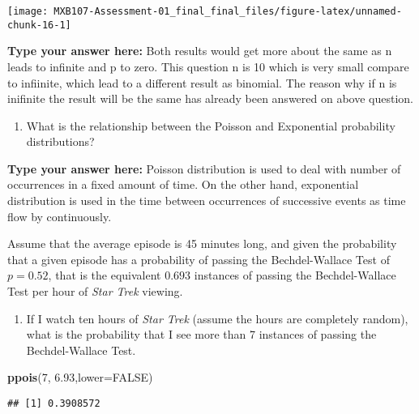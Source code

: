 \documentclass[
]{article}
\newenvironment{Shaded}{\begin{snugshade}}{\end{snugshade}}
\newcommand{\DataTypeTok}[1]{\textcolor[rgb]{0.13,0.29,0.53}{#1}}
\newcommand{\DecValTok}[1]{\textcolor[rgb]{0.00,0.00,0.81}{#1}}
\newcommand{\FloatTok}[1]{\textcolor[rgb]{0.00,0.00,0.81}{#1}}
\newcommand{\KeywordTok}[1]{\textcolor[rgb]{0.13,0.29,0.53}{\textbf{#1}}}
\newcommand{\NormalTok}[1]{#1}
\newcommand{\OtherTok}[1]{\textcolor[rgb]{0.56,0.35,0.01}{#1}}
\providecommand{\tightlist}{%
  \setlength{\itemsep}{0pt}\setlength{\parskip}{0pt}}
\begin{document}
\begin{center}\texttt{[image: MXB107-Assessment-01\_final\_final\_files/figure-latex/unnamed-chunk-16-1]} \end{center}

\textbf{Type your answer here:} Both results would get more about the
same as n leads to infinite and p to zero. This question n is 10 which
is very small compare to infiinite, which lead to a different result as
binomial. The reason why if n is inifinite the result will be the same
has already been answered on above question.

\begin{enumerate}
\def\labelenumi{\alph{enumi}.}
\setcounter{enumi}{2}
\tightlist
\item
  What is the relationship between the Poisson and Exponential
  probability distributions?
\end{enumerate}

\textbf{Type your answer here:} Poisson distribution is used to deal
with number of occurrences in a fixed amount of time. On the other hand,
exponential distribution is used in the time between occurrences of
successive events as time flow by continuously.

Assume that the average episode is 45 minutes long, and given the
probability that a given episode has a probability of passing the
Bechdel-Wallace Test of \(p=0.52\), that is the equivalent \(0.693\)
instances of passing the Bechdel-Wallace Test per hour of \emph{Star
Trek} viewing.

\begin{enumerate}
\def\labelenumi{\alph{enumi}.}
\setcounter{enumi}{2}
\tightlist
\item
  If I watch ten hours of \emph{Star Trek} (assume the hours are
  completely random), what is the probability that I see more than 7
  instances of passing the Bechdel-Wallace Test.
\end{enumerate}

\begin{Shaded}
\begin{Highlighting}[]
\KeywordTok{ppois}\NormalTok{(}\DecValTok{7}\NormalTok{, }\FloatTok{6.93}\NormalTok{,}\DataTypeTok{lower=}\OtherTok{FALSE}\NormalTok{)}
\end{Highlighting}
\end{Shaded}

\begin{verbatim}
## [1] 0.3908572
\end{verbatim}
\end{document}
